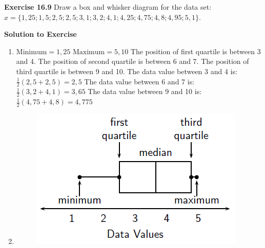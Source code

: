 \begin{description}[noitemsep]
\begin{description}[noitemsep]
{      \begin{mdframed}[linewidth=4, leftmargin=40, rightmargin=40]  
      \begin{exercise}
    \noindent\textbf{Exercise 16.9}\label{m39400*eip-570}
  \label{m39400*eip-327}
Draw a box and whisker diagram for the data set:
$x=\{1,25;1,5;2,5;2,5;3,1;3,2;4,1;4,25;4,75;4,8;4,95;5,1\}$.
  \par 
\vspace{5pt}
\label{m39400*eip-402}\noindent\textbf{Solution to Exercise }
  \label{m39400*eip-701}\begin{enumerate}[noitemsep, label=\textbf{Step} \textbf{\arabic*}. ] 
            \leftskip=20pt\rightskip=\leftskip\item \newline
    $\mathrm{Minimum}=1,25$\newline
$\mathrm{Maximum}=5,10$\newline
The position of first quartile is between 3 and 4. \newline
The position of second quartile is between 6 and 7. \newline
The position of third quartile is between 9 and 10. \newline
The data value between 3 and 4 is:
$\frac{1}{2}\left(2,5+2,5\right)=2,5$\newline
The data value between 6 and 7 is:
$\frac{1}{2}\left(3,2+4,1\right)=3,65$\newline
The data value between 9 and 10 is: 
$\frac{1}{2}\left(4,75+4,8\right)=4,775$\item 
    \setcounter{subfigure}{0}
	\begin{figure}[H] %
    \begin{center}
    \label{m39400*uid34553!!!underscore!!!media}\label{m39400*uid34553!!!underscore!!!printimage}\includegraphics{col11306.imgs/m39400_boxwhisker1.png} %
      \vspace{2pt}
    \vspace{.1in}
    \end{center}
 \end{figure}       \end{enumerate}
    \end{exercise}
    \end{mdframed}
    }
    \noindent
  \label{m39400*uid86}

\end{description}
\end{description}
